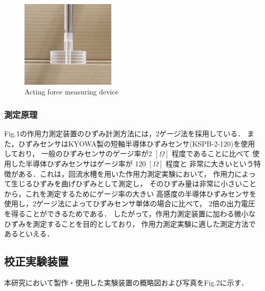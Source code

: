 \begin{figure}[htbp]
\begin{minipage}[b]{0.42\linewidth}
        \includegraphics[width=45mm]{images/21-3.png}
    \end{minipage}
    \caption{Acting force measuring device}
\end{figure}

\newpage

\subsubsection{測定原理}

Fig.1の作用力測定装置のひずみ計測方法には，2ゲージ法を採用している．
また，ひずみセンサはKYOWA製の短軸半導体ひずみセンサ(KSPB-2-120)を使用しており，
一般のひずみセンサのゲージ率が2 $[\Omega]$ 程度であることに比べて
使用した半導体ひずみセンサはゲージ率が 120 $[\Omega]$ 程度と
非常に大きいという特徴がある．これは，回流水槽を用いた作用力測定実験において，
作用力によって生じるひずみを曲げひずみとして測定し，
そのひずみ量は非常に小さいことから，これを測定するためにゲージ率の大きい
高感度の半導体ひずみセンサを使用し，2ゲージ法によってひずみセンサ単体の場合に比べて，
2倍の出力電圧を得ることができるためである．
したがって，作用力測定装置に加わる微小なひずみを測定することを目的としており，
作用力測定実験に適した測定方法であるといえる．

\subsection{校正実験装置}
本研究において製作・使用した実験装置の概略図および写真をFig.2に示す．

